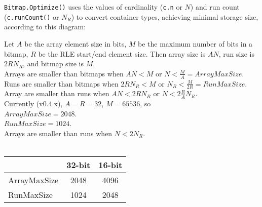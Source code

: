 \documentclass{article} %
\begin{document}
\texttt{Bitmap.Optimize()} uses the values of cardinality (\texttt{c.n} or $N$) and
run count (\texttt{c.runCount()} or $N_R$) to convert container types, achieving minimal storage size, according to this diagram:\\


\bigskip


Let $A$ be the array element size in bits, $M$ be the maximum number of bits in
a bitmap, $R$ be the RLE start/end element size. Then array size is $AN$, run size is
$2RN_R$, and bitmap size is $M$.\\

Arrays are smaller than bitmaps when $AN < M$ or $N < \frac{M}{A} = ArrayMaxSize$.\\
Runs are smaller than bitmaps when $2RN_R < M$ or $N_R < \frac{M}{2R} = RunMaxSize$.\\
Array are smaller than runs when $AN < 2RN_R$ or $N < 2\frac{R}{A} N_R$.\\

Currently (v0.4.x), $A = R = 32$, $M = 65536$, so\\ 

$ArrayMaxSize = 2048$.\\
$RunMaxSize = 1024$.\\
Arrays are smaller than runs when $N < 2 N_R$.\\
\\
\begin{tabular}{l | c | c}
    & 32-bit & 16-bit \\
  \hline
  ArrayMaxSize & 2048 & 4096 \\
  \hline
  RunMaxSize & 1024 & 2048 \\
\end{tabular}
\end{document}
